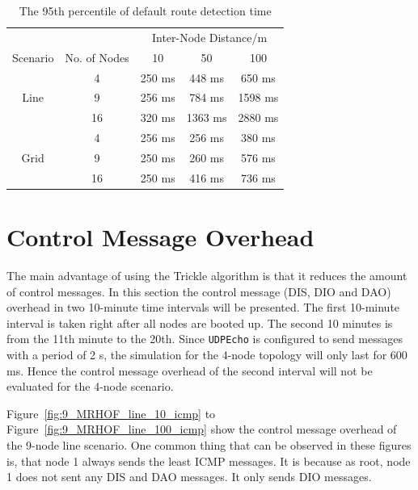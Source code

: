 \begin{table}
\caption{The 95th percentile of default route detection time}
\centering
    \begin{tabular}{ cc| c | c | c |} \cline{3-5}
     & & \multicolumn{3}{|c|}{Inter-Node Distance/m }\\ \cline{1-5}
     \multicolumn{1}{|c|}{Scenario} & No. of Nodes  & 10      & 50      & 100     \\  \hline
     \multicolumn{1}{|c|}{\multirow{3}{*}{Line}} &
     \multicolumn{1}{|c|}{4}  & 250 ms  & 448 ms  & 650 ms  \\  \cline{2-5}
     \multicolumn{1}{|c|}{} & 9  & 256 ms  & 784 ms  & 1598 ms \\  \cline{2-5}
     \multicolumn{1}{|c|}{} & 16 & 320 ms  & 1363 ms & 2880 ms \\  \cline{1-5}
     \multicolumn{1}{|c|}{\multirow{4}{*}{Grid}} &
     \multicolumn{1}{|c|}{4}  & 256 ms  & 256 ms  & 380 ms  \\  \cline{2-5}
     \multicolumn{1}{|c|}{} & 9  & 250 ms  & 260 ms  & 576 ms  \\  \cline{2-5}
     \multicolumn{1}{|c|}{} & 16 & 250 ms  & 416 ms  & 736 ms  \\  \cline{1-5}
    \end{tabular}
  \label{table:95}
\end{table}


\section{Control Message Overhead}
\label{ICMP}
The main advantage of using the Trickle algorithm is that it reduces the amount of control messages. In this section the control message (DIS, DIO and DAO) overhead in two 10-minute time intervals will be presented. The first 10-minute interval is taken right after all nodes are booted up. The second 10 minutes is from the 11th minute to the 20th. Since \texttt{UDPEcho} is configured to send messages with a period of 2 s, the simulation for the 4-node topology will only last for 600 ms. Hence the control message overhead of the second interval will not be evaluated for the 4-node scenario.

Figure~\ref{fig:9_MRHOF_line_10_icmp} to Figure~\ref{fig:9_MRHOF_line_100_icmp} show the control message overhead  of the 9-node line scenario. One common thing that can be observed in these figures is, that node 1 always sends the least ICMP messages. It is because as root, node 1 does not sent any DIS and DAO messages. It only sends DIO messages.

